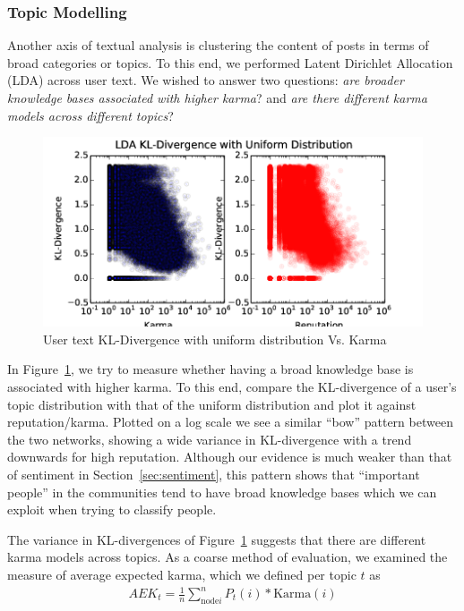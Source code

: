 \documentclass[11pt]{article}
\begin{document}
\subsubsection{Topic Modelling}

Another axis of textual analysis is clustering the content of posts in terms of
broad categories or topics. To this end, we performed Latent Dirichlet
Allocation (LDA) \cite{blei2003latent} across user text. We wished to answer two
questions: \textit{are broader knowledge bases associated with higher karma}?
and \textit{are there different karma models across different topics}?

\begin{figure}[h]
\centering
\includegraphics[width=\linewidth]{lda_kl-png}
\caption{User text KL-Divergence with uniform distribution Vs. Karma}
\label{fig:lda_kl}
\end{figure}

In Figure~\ref{fig:lda_kl}, we try to measure whether having a broad knowledge
base is associated with higher karma. To this end, compare the KL-divergence of
a user's topic distribution with that of the uniform distribution and plot it
against reputation/karma. Plotted on a log scale we see a similar ``bow''
pattern between the two networks, showing a wide variance in KL-divergence with
a trend downwards for high reputation. Although our evidence is much weaker than
that of sentiment in Section~\ref{sec:sentiment}, this pattern shows that
``important people'' in the communities tend to have broad knowledge bases which
we can exploit when trying to classify people.

The variance in KL-divergences of Figure~\ref{fig:lda_kl} suggests that there
are different karma models across topics. As a coarse method of evaluation, we
examined the measure of average expected karma, which we defined per topic $t$
as
\begin{align*}
AEK_t = \frac{1}{n} \sum_{\text{node} i}^n P_t(i) * \text{Karma}(i)
\end{align*}
\end{document}
